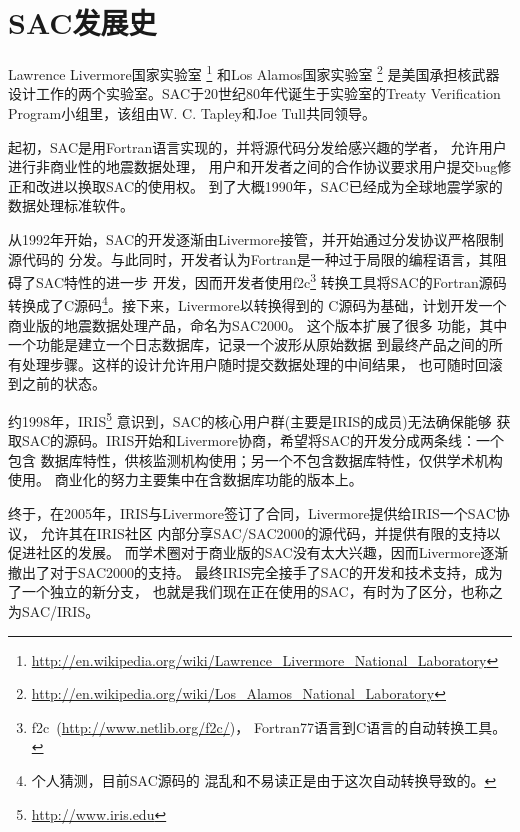 \section{SAC发展史}
\label{sec:history}

Lawrence Livermore国家实验室
\footnote{\url{http://en.wikipedia.org/wiki/Lawrence\_Livermore\_National\_Laboratory}}
和Los Alamos国家实验室
\footnote{\url{http://en.wikipedia.org/wiki/Los\_Alamos\_National\_Laboratory}}
是美国承担核武器设计工作的两个实验室。SAC于20世纪80年代诞生于实验室的Treaty Verification Program小组里，该组由W. C. Tapley和Joe Tull共同领导。

起初，SAC是用Fortran语言实现的，并将源代码分发给感兴趣的学者，
允许用户进行非商业性的地震数据处理，
用户和开发者之间的合作协议要求用户提交bug修正和改进以换取SAC的使用权。
到了大概1990年，SAC已经成为全球地震学家的数据处理标准软件。

从1992年开始，SAC的开发逐渐由Livermore接管，并开始通过分发协议严格限制源代码的
分发。与此同时，开发者认为Fortran是一种过于局限的编程语言，其阻碍了SAC特性的进一步
开发，因而开发者使用f2c\footnote{f2c~(\url{http://www.netlib.org/f2c/})，
Fortran77语言到C语言的自动转换工具。}
转换工具将SAC的Fortran源码转换成了C源码\footnote{个人猜测，目前SAC源码的
混乱和不易读正是由于这次自动转换导致的。}。接下来，Livermore以转换得到的
C源码为基础，计划开发一个商业版的地震数据处理产品，命名为SAC2000。
这个版本扩展了很多
功能，其中一个功能是建立一个日志数据库，记录一个波形从原始数据
到最终产品之间的所有处理步骤。这样的设计允许用户随时提交数据处理的中间结果，
也可随时回滚到之前的状态。

约1998年，IRIS\footnote{\url{http://www.iris.edu}}
意识到，SAC的核心用户群(主要是IRIS的成员)无法确保能够
获取SAC的源码。IRIS开始和Livermore协商，希望将SAC的开发分成两条线：一个包含
数据库特性，供核监测机构使用；另一个不包含数据库特性，仅供学术机构使用。
商业化的努力主要集中在含数据库功能的版本上。

终于，在2005年，IRIS与Livermore签订了合同，Livermore提供给IRIS一个SAC协议，
允许其在IRIS社区
内部分享SAC/SAC2000的源代码，并提供有限的支持以促进社区的发展。
而学术圈对于商业版的SAC没有太大兴趣，因而Livermore逐渐撤出了对于SAC2000的支持。
最终IRIS完全接手了SAC的开发和技术支持，成为了一个独立的新分支，
也就是我们现在正在使用的SAC，有时为了区分，也称之为SAC/IRIS。
